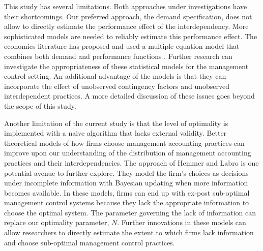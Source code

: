 \documentclass[12pt]{article}
\begin{document}
This study has several limitations. Both approaches under investigations
have their shortcomings. Our preferred approach, the demand
specification, does not allow to directly estimate the performance
effect of the interdependency. More sophisticated models are needed to
reliably estimate this performance effect. The economics literature has
proposed and used a multiple equation model that combines both demand
and performance functions
\citep{Athey1998, Gentzkow2007, Kretschmer2012, Miravete2006}. Further
research can investigate the appropriateness of these statistical models
for the management control setting. An additional advantage of the
models is that they can incorporate the effect of unobserved contingency
factors and unobserved interdependent practices. A more detailed
discussion of these issues goes beyond the scope of this study.

Another limitation of the current study is that the level of optimality
is implemented with a naive algorithm that lacks external validity.
Better theoretical models of how firms choose management accounting
practices can improve upon our understanding of the distribution of
management accounting practices and their interdependencies. The
approach of Hemmer and Labro \citeyearpar{Hemmer2015} is one potential
avenue to further explore. They model the firm's choices as decisions
under incomplete information with Bayesian updating when more
information becomes available. In these models, firms can end up with
ex-post sub-optimal management control systems because they lack the
appropriate information to choose the optimal system. The parameter
governing the lack of information can replace our optimality parameter,
\(N\). Further innovations in these models can allow researchers to
directly estimate the extent to which firms lack information and choose
sub-optimal management control practices.
\end{document}
